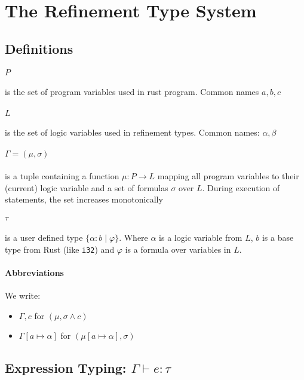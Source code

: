 \documentclass{article}
\theoremstyle{definition}
\begin{document}
\section{The Refinement Type System}

\subsection{Definitions}

\paragraph*{$P$} is the set of program variables used in rust program. Common names $a, b, c$
\paragraph*{$L$} is the set of logic variables used in refinement types. Common names: $\alpha, \beta$

\paragraph*{$\Gamma = (\mu, \sigma)$} is a tuple containing a function $\mu: P \to L$ mapping all program variables to their (current) logic variable and a set of formulas $\sigma$ over $L$. During execution of statements, the set increases monotonically

\paragraph*{$\tau$} is a user defined type $\{ \alpha : b \mid \varphi\}$. Where $\alpha$ is a logic variable from $L$, $b$ is a base type from Rust (like \texttt{i32}) and $\varphi$ is a formula over variables in $L$.

\paragraph*{Abbreviations}
We write:
\begin{itemize}
  \item  $\Gamma, c$ for $(\mu, \sigma \wedge c)$
  \item $\Gamma[a \mapsto \alpha]$ for $(\mu[a \mapsto \alpha], \sigma)$
\end{itemize}


\subsection{Expression Typing: $\Gamma \vdash e : \tau$}
\end{document}
